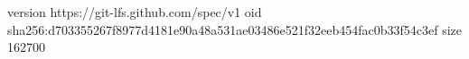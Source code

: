 version https://git-lfs.github.com/spec/v1
oid sha256:d703355267f8977d4181e90a48a531ae03486e521f32eeb454fac0b33f54c3ef
size 162700
